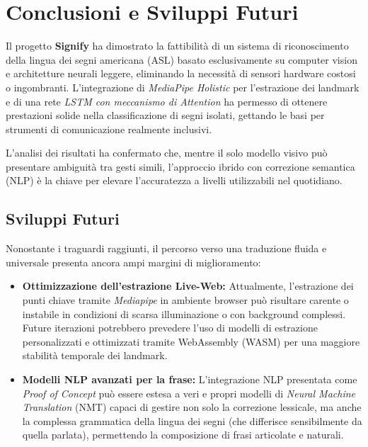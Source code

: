 
\section{Conclusioni e Sviluppi Futuri}

Il progetto \textbf{Signify} ha dimostrato la fattibilità di un sistema di riconoscimento della lingua dei segni americana (ASL) basato esclusivamente su computer vision e architetture neurali leggere, eliminando la necessità di sensori hardware costosi o ingombranti. L'integrazione di \textit{MediaPipe Holistic} per l'estrazione dei landmark e di una rete \textit{LSTM con meccanismo di Attention} ha permesso di ottenere prestazioni solide nella classificazione di segni isolati, gettando le basi per strumenti di comunicazione realmente inclusivi.

L'analisi dei risultati ha confermato che, mentre il solo modello visivo può presentare ambiguità tra gesti simili, l'approccio ibrido con correzione semantica (NLP) è la chiave per elevare l'accuratezza a livelli utilizzabili nel quotidiano.

\subsection{Sviluppi Futuri}
Nonostante i traguardi raggiunti, il percorso verso una traduzione fluida e universale presenta ancora ampi margini di miglioramento:

\begin{itemize}
    \item \textbf{Ottimizzazione dell'estrazione Live-Web:} Attualmente, l'estrazione dei punti chiave tramite \textit{Mediapipe} in ambiente browser può risultare carente o instabile in condizioni di scarsa illuminazione o con background complessi. Future iterazioni potrebbero prevedere l'uso di modelli di estrazione personalizzati e ottimizzati tramite WebAssembly (WASM) per una maggiore stabilità temporale dei landmark.
    \item \textbf{Modelli NLP avanzati per la frase:} L'integrazione NLP presentata come \textit{Proof of Concept} può essere estesa a veri e propri modelli di \textit{Neural Machine Translation} (NMT) capaci di gestire non solo la correzione lessicale, ma anche la complessa grammatica della lingua dei segni (che differisce sensibilmente da quella parlata), permettendo la composizione di frasi articolate e naturali.
\end{itemize}

